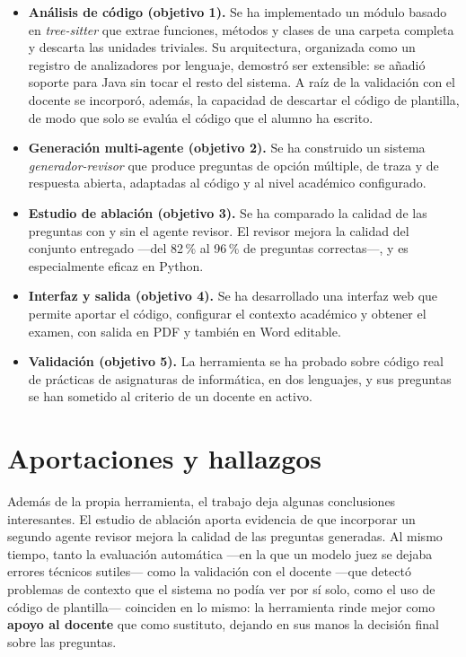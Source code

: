 \begin{itemize}
  \item \textbf{Análisis de código (objetivo 1).} Se ha implementado un módulo
        basado en \emph{tree-sitter} que extrae funciones, métodos y clases de
        una carpeta completa y descarta las unidades triviales. Su
        arquitectura, organizada como un registro de analizadores por lenguaje,
        demostró ser extensible: se añadió soporte para Java sin tocar
        el resto del sistema. A raíz de la validación con el docente se
        incorporó, además, la capacidad de descartar el código de plantilla, de
        modo que solo se evalúa el código que el alumno ha escrito.
  \item \textbf{Generación multi-agente (objetivo 2).} Se ha construido un
        sistema \emph{generador-revisor} que produce preguntas de opción
        múltiple, de traza y de respuesta abierta, adaptadas al código y al
        nivel académico configurado.
  \item \textbf{Estudio de ablación (objetivo 3).} Se ha comparado la calidad
        de las preguntas con y sin el agente revisor. El revisor mejora la
        calidad del conjunto entregado ---del 82\,\% al 96\,\% de preguntas
        correctas---, y es especialmente eficaz en Python.
  \item \textbf{Interfaz y salida (objetivo 4).} Se ha desarrollado una
        interfaz web que permite aportar el código, configurar el contexto
        académico y obtener el examen, con salida en PDF y también en Word
        editable.
  \item \textbf{Validación (objetivo 5).} La herramienta se ha probado sobre
        código real de prácticas de asignaturas de informática, en dos
        lenguajes, y sus preguntas se han sometido al criterio de un docente en
        activo.
\end{itemize}


\section{Aportaciones y hallazgos}
\label{sec:aportaciones}

Además de la propia herramienta, el trabajo deja algunas conclusiones
interesantes. El estudio de ablación aporta evidencia de que incorporar un segundo
agente revisor mejora la calidad de las preguntas generadas. Al mismo tiempo,
tanto la evaluación automática ---en la que un modelo juez se dejaba errores
técnicos sutiles--- como la validación con el docente ---que detectó problemas
de contexto que el sistema no podía ver por sí solo, como el uso de código de
plantilla--- coinciden en lo mismo: la herramienta rinde mejor como
\textbf{apoyo al docente} que como sustituto, dejando en sus manos la decisión
final sobre las preguntas.


